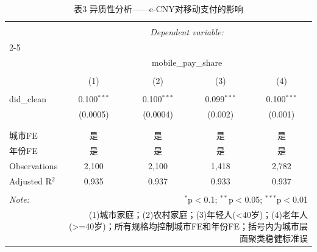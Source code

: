 
\begin{table}[!htbp] \centering 
  \caption{表3  异质性分析——e-CNY对移动支付的影响} 
  \label{tab:heterogeneity} 
\begin{tabular}{@{\extracolsep{5pt}}lcccc} 
\\[-1.8ex]\hline 
\hline \\[-1.8ex] 
 & \multicolumn{4}{c}{\textit{Dependent variable:}} \\ 
\cline{2-5} 
\\[-1.8ex] & \multicolumn{4}{c}{mobile\_pay\_share} \\ 
\\[-1.8ex] & (1) & (2) & (3) & (4)\\ 
\hline \\[-1.8ex] 
 did\_clean & 0.100$^{***}$ & 0.100$^{***}$ & 0.099$^{***}$ & 0.100$^{***}$ \\ 
  & (0.0005) & (0.0004) & (0.002) & (0.001) \\ 
  & & & & \\ 
\hline \\[-1.8ex] 
城市FE & 是 & 是 & 是 & 是 \\ 
年份FE & 是 & 是 & 是 & 是 \\ 
Observations & 2,100 & 2,100 & 1,418 & 2,782 \\ 
Adjusted R$^{2}$ & 0.935 & 0.937 & 0.933 & 0.937 \\ 
\hline 
\hline \\[-1.8ex] 
\textit{Note:}  & \multicolumn{4}{r}{$^{*}$p$<$0.1; $^{**}$p$<$0.05; $^{***}$p$<$0.01} \\ 
 & \multicolumn{4}{r}{(1)城市家庭；(2)农村家庭；(3)年轻人(<40岁)；(4)老年人(>=40岁)；所有规格均控制城市FE和年份FE；括号内为城市层面聚类稳健标准误} \\ 
\end{tabular} 
\end{table} 
